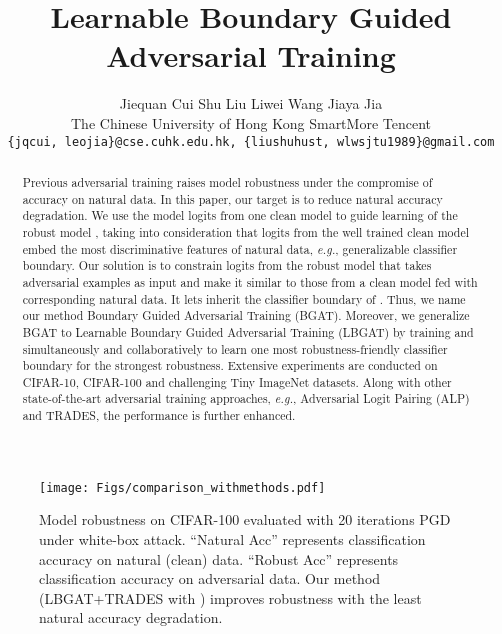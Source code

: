 \documentclass[final]{cvpr}
\begin{document}
\title{Learnable Boundary Guided Adversarial Training}
\author{
	Jiequan Cui  \quad 
	Shu Liu  \quad
	Liwei Wang  \quad
	Jiaya Jia  \\
	The Chinese University of Hong Kong \hspace{1cm} SmartMore \hspace{1cm} Tencent \vspace{.7em}\\
	{\tt\small \{jqcui, leojia\}@cse.cuhk.edu.hk, \{liushuhust, wlwsjtu1989\}@gmail.com}
}


\maketitle
\begin{abstract}
   	Previous adversarial training raises model robustness under the compromise of accuracy on natural data. In this paper, our target is to reduce natural accuracy degradation. We use the model logits from one clean model  to guide learning of the robust model , taking into consideration that logits from the well trained clean model  embed the most discriminative features of natural data, {\it e.g.}, generalizable classifier boundary. Our solution is to constrain logits from the robust model  that takes adversarial examples as input and make it similar to those from a clean model  fed with corresponding natural data. It lets  inherit the classifier boundary of . Thus, we name our method Boundary Guided Adversarial Training (BGAT).
    Moreover, we generalize BGAT to Learnable Boundary Guided Adversarial Training (LBGAT) by training  and  simultaneously and collaboratively to learn one most robustness-friendly classifier boundary for the strongest robustness. Extensive experiments are conducted on CIFAR-10, CIFAR-100 and challenging Tiny ImageNet datasets. Along with other state-of-the-art adversarial training approaches, {\it e.g.}, Adversarial Logit Pairing (ALP) and TRADES, the performance is further enhanced.
\end{abstract}



\begin{figure}
	\begin{center}
		\texttt{[image: Figs/comparison\_withmethods.pdf]}
		\caption{Model robustness on CIFAR-100 evaluated with 20 iterations PGD under white-box attack. ``Natural Acc'' represents classification accuracy on natural (clean) data. ``Robust Acc'' represents classification accuracy on adversarial data.
			Our method (LBGAT+TRADES with ) improves robustness with the least natural accuracy degradation.}
		\label{fig:comparison_methods}
	\end{center}
    \vspace{-0.2in}
\end{figure}
\end{document}
